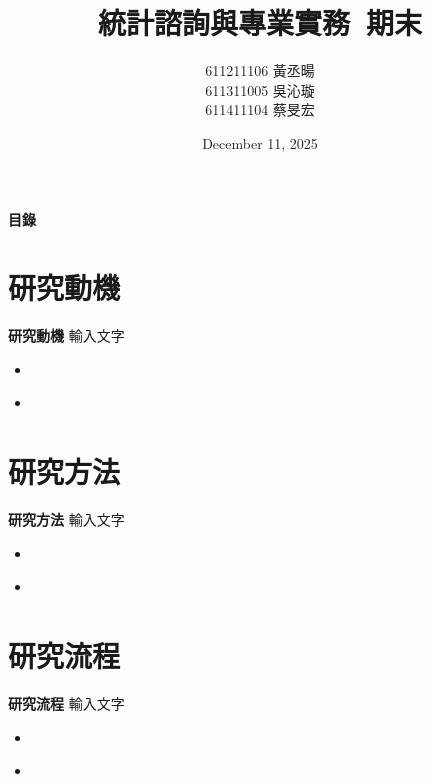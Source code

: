 \documentclass[12pt,aspectratio=43]{beamer}
\title{\fontsize{24pt}{20pt}統計諮詢與專業實務\ 期末}
\author{\fontsize{12pt}{0pt}611211106 黃丞暘\\ 611311005 吳沁璇\\ 611411104 蔡旻宏}
\institute{\fontsize{12pt}{0pt}國立東華大學應用數學所}
\date{December 11, 2025}
\begin{document}
\begin{frame}
  \titlepage
\end{frame}

\begin{frame}{\textbf{目錄}}
  \tableofcontents
\end{frame}

\section{研究動機}

\begin{frame}{\textbf{研究動機}}
\linespread{1.5}
  {輸入文字}
  \begin{itemize}
    \item
  \end{itemize}
  \begin{itemize}
    \item 
  \end{itemize}
\end{frame}

\section{研究方法}

\begin{frame}{\textbf{研究方法}}
\linespread{1.5}
  {輸入文字}
  \begin{itemize}
    \item
  \end{itemize}
  \begin{itemize}
    \item 
  \end{itemize}
\end{frame}

\section{研究流程}

\begin{frame}{\textbf{研究流程}}
\linespread{1.5}
  {輸入文字}
  \begin{itemize}
    \item
  \end{itemize}
  \begin{itemize}
    \item 
  \end{itemize}
\end{frame}
\end{document}
